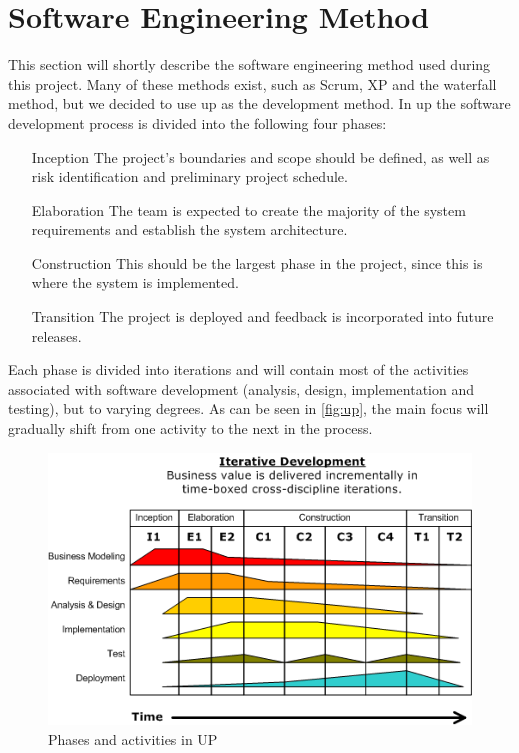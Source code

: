 \section{Software Engineering Method}
This section will shortly describe the software engineering method used during this project. Many of these methods exist, such as Scrum, XP and the waterfall method, but we decided to use \ac{up} as the development method. In \ac{up} the software development process is divided into the following four phases: 

\begin{itemize}
\item[Inception] The project's boundaries and scope should be defined, as well as risk identification and preliminary project schedule.
\item[Elaboration] The team is expected to create the majority of the system requirements and establish the system architecture.
\item[Construction] This should be the largest phase in the project, since this is where the system is implemented.
\item[Transition] The project is deployed and feedback is incorporated into future releases.
\end{itemize}

Each phase is divided into iterations and will contain most of the activities associated with software development (analysis, design, implementation and testing), but to varying degrees. As can be seen in \autoref{fig:up}, the main focus will gradually shift from one activity to the next in the process.

\begin{figure}[hptb]
  \centering
    \includegraphics[width=\textwidth]{img/Development-iterative.gif}
  \caption{Phases and activities in UP}
  \label{fig:up}
\end{figure}

